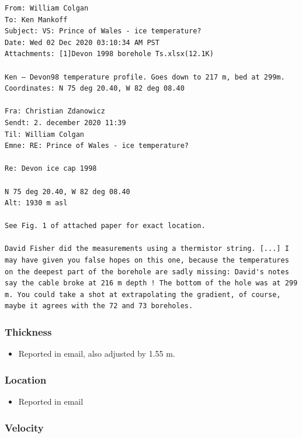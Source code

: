 \documentclass[article,a4paper,times,11pt,twoside]{article}
\begin{document}
\begin{verbatim}
From: William Colgan
To: Ken Mankoff
Subject: VS: Prince of Wales - ice temperature?
Date: Wed 02 Dec 2020 03:10:34 AM PST
Attachments: [1]Devon 1998 borehole Ts.xlsx(12.1K)

Ken – Devon98 temperature profile. Goes down to 217 m, bed at 299m.
Coordinates: N 75 deg 20.40, W 82 deg 08.40

Fra: Christian Zdanowicz
Sendt: 2. december 2020 11:39
Til: William Colgan
Emne: RE: Prince of Wales - ice temperature?

Re: Devon ice cap 1998

N 75 deg 20.40, W 82 deg 08.40
Alt: 1930 m asl

See Fig. 1 of attached paper for exact location.

David Fisher did the measurements using a thermistor string. [...] I
may have given you false hopes on this one, because the temperatures
on the deepest part of the borehole are sadly missing: David's notes
say the cable broke at 216 m depth ! The bottom of the hole was at 299
m. You could take a shot at extrapolating the gradient, of course,
maybe it agrees with the 72 and 73 boreholes.
\end{verbatim}

\subsubsection{Thickness}
\label{sec:org0395013}

\begin{itemize}
\item Reported in email, also adjusted by 1.55 m.
\end{itemize}

\subsubsection{Location}
\label{sec:org24eed79}

\begin{itemize}
\item Reported in email
\end{itemize}

\subsubsection{Velocity}
\label{sec:org9ec8aa8}
\clearpage
\end{document}
